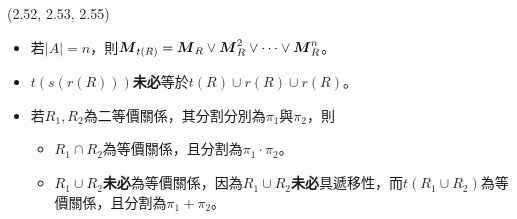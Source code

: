 \item \begin{theorem}{(2.52, 2.53, 2.55)} \quad\quad
    \begin{itemize}
        \item 若$|A| = n$，則$\boldsymbol{M}_{t(R)} = \boldsymbol{M}_{R} \lor \boldsymbol{M}_{R}^2 \lor \cdots \lor \boldsymbol{M}_{R}^n$。
        \item $t(s(r(R)))$\textbf{未必}等於$t(R) \cup r(R) \cup r(R)$。
        \item 若$R_1, R_2$為二等價關係，其分割分別為$\pi_1$與$\pi_2$，則
            \begin{itemize}
                \item $R_1 \cap R_2$為等價關係，且分割為$\pi_1 \cdot \pi_2$。
                \item $R_1 \cup R_2$\textbf{未必}為等價關係，因為$R_1 \cup R_2$\textbf{未必}具遞移性，而$t(R_1 \cup R_2)$為等價關係，且分割為$\pi_1 + \pi_2$。
            \end{itemize}
    \end{itemize}
\end{theorem}

